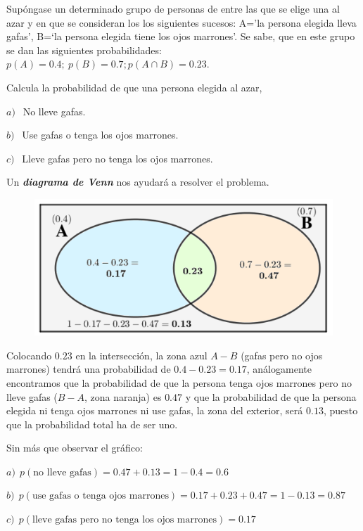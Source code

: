 \begin{ejemplo}
\begin{ejre}
	Supóngase un determinado grupo de personas de entre las que se elige una al azar y en que se consideran los los siguientes sucesos: A='la persona elegida lleva gafas', B=`la persona elegida tiene los ojos marrones'. Se sabe, que en este grupo se dan las siguientes probabilidades: $p(A)=0.4; \ p(B)=0.7; p(A\cap B)=0.23$.
	
	Calcula la probabilidad de que una persona elegida al azar,
	
$a)\ \ $ No lleve gafas.

$b)\ \ $ Use gafas o tenga los ojos marrones.

$c)\ \ $ Lleve gafas pero no tenga los ojos marrones.	
\end{ejre}	

\vspace{4mm} Un \textbf{\emph{diagrama de Venn}} nos ayudará a resolver el problema.

\begin{figure}[H]
			\centering
			\includegraphics[width=.6\textwidth]{imagenes/imagenes02/T02IM17.png}
	\end{figure}
\begin{small}Colocando $0.23$ en la intersección, la zona azul $A-B$ (gafas pero no ojos marrones) tendrá una probabilidad de $0.4-0.23=0.17$, análogamente encontramos que la probabilidad de que la persona tenga ojos marrones pero no lleve gafas ($B-A$, zona naranja) es $0.47$ y que la probabilidad de que la persona elegida ni tenga ojos marrones ni use gafas, la zona del exterior, será $0.13$, puesto que la probabilidad total ha de ser uno.\end{small}

Sin más que observar el gráfico: 

$a)\ \ p(\text{no lleve gafas})=0.47+0.13=1-0.4=0.6$

$b)\ \ p(\text{use gafas o tenga ojos marrones})=0.17+0.23+0.47=1-0.13=0.87$

$c)\ \ p(\text{lleve gafas pero no tenga los ojos marrones})=0.17$


\end{ejemplo}
